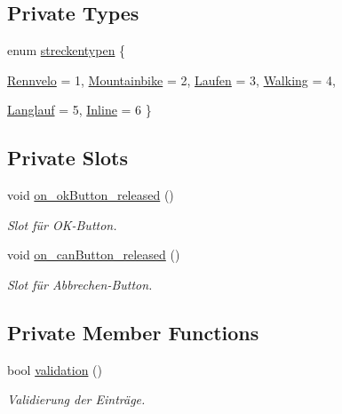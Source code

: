 \subsection*{Private Types}
\begin{CompactItemize}
\item 
enum \hyperlink{class_neuer_user_dialog_082ce8ccd9b1a7c9856445d43ce793cc}{streckentypen} \{ \par
\hyperlink{class_neuer_user_dialog_082ce8ccd9b1a7c9856445d43ce793cc2d729f0c0aed41c25543a552440cbe3e}{Rennvelo} = 1, 
\hyperlink{class_neuer_user_dialog_082ce8ccd9b1a7c9856445d43ce793cc3cefb34589d488d0af6b64bd2b7906fb}{Mountainbike} = 2, 
\hyperlink{class_neuer_user_dialog_082ce8ccd9b1a7c9856445d43ce793cc4d2e41951b6b3ca8195716d1c21b6280}{Laufen} = 3, 
\hyperlink{class_neuer_user_dialog_082ce8ccd9b1a7c9856445d43ce793cc9651254975c1086a510915966b1f4e2b}{Walking} = 4, 
\par
\hyperlink{class_neuer_user_dialog_082ce8ccd9b1a7c9856445d43ce793cce9a227562de07b9e59787cf4944f55e9}{Langlauf} = 5, 
\hyperlink{class_neuer_user_dialog_082ce8ccd9b1a7c9856445d43ce793ccaf72dd6270ab5200ace99b5c70da5772}{Inline} = 6
 \}
\end{CompactItemize}
\subsection*{Private Slots}
\begin{CompactItemize}
\item 
void \hyperlink{class_neuer_user_dialog_8efa7a01186a48c4b15abb986fc3388b}{on\_\-okButton\_\-released} ()
\begin{CompactList}\small\item\em Slot für OK-Button. \item\end{CompactList}\item 
void \hyperlink{class_neuer_user_dialog_fd1184d0212d7fda723c67a29d09093a}{on\_\-canButton\_\-released} ()
\begin{CompactList}\small\item\em Slot für Abbrechen-Button. \item\end{CompactList}\end{CompactItemize}
\subsection*{Private Member Functions}
\begin{CompactItemize}
\item 
bool \hyperlink{class_neuer_user_dialog_6b115697c371d742e48926b7f084ef5e}{validation} ()
\begin{CompactList}\small\item\em Validierung der Einträge. \item\end{CompactList}\end{CompactItemize}
